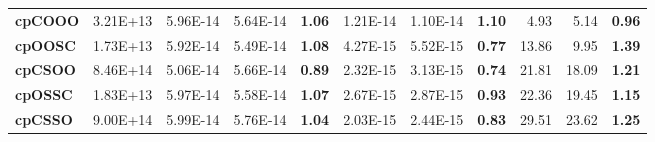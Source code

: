 \documentclass[encoding=utf8,british]{tumphthesis}
\begin{document}
\begin{table}[H]
\begin{subtable}{1\textwidth}
{\begin{tabular}{|l|r|rrr|rrr|rrr|}
\textbf{cpCOOO}  & 3.21E+13                                     & 5.96E-14                                           & 5.64E-14                                            & \textbf{1.06}                                    & 1.21E-14                                           & 1.10E-14                                            & \textbf{1.10}                                    & 4.93                                               & 5.14                                                & \textbf{0.96}                                    \\
\rowcolor[HTML]{CFE2F3} 
\textbf{cpOOSC}  & 1.73E+13                                     & 5.92E-14                                           & 5.49E-14                                            & \textbf{1.08}                                    & 4.27E-15                                           & 5.52E-15                                            & \textbf{0.77}                                    & 13.86                                              & 9.95                                                & \textbf{1.39}                                    \\
\textbf{cpCSOO}  & 8.46E+14                                     & 5.06E-14                                           & 5.66E-14                                            & \textbf{0.89}                                    & 2.32E-15                                           & 3.13E-15                                            & \textbf{0.74}                                    & 21.81                                              & 18.09                                               & \textbf{1.21}                                    \\
\rowcolor[HTML]{CFE2F3} 
\textbf{cpOSSC}  & 1.83E+13                                     & 5.97E-14                                           & 5.58E-14                                            & \textbf{1.07}                                    & 2.67E-15                                           & 2.87E-15                                            & \textbf{0.93}                                    & 22.36                                              & 19.45                                               & \textbf{1.15}                                    \\
\textbf{cpCSSO}  & 9.00E+14                                     & 5.99E-14                                           & 5.76E-14                                            & \textbf{1.04}                                    & 2.03E-15                                           & 2.44E-15                                            & \textbf{0.83}                                    & 29.51                                              & 23.62                                               & \textbf{1.25}                                    \\

\end{tabular}}
\end{subtable}
\end{table}
\end{document}
